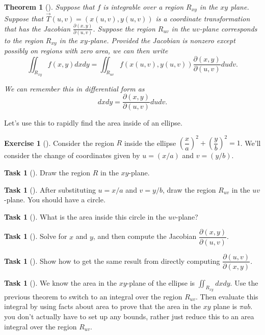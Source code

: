 \documentclass[10pt,]{book}
\theoremstyle{plain}
\newtheorem{theorem}{Theorem}[section]
\theoremstyle{definition}
\theoremstyle{definition}
\theoremstyle{definition}
\theoremstyle{definition}
\newtheorem{exploration}[project]{Exercise}
\newtheorem{task}[project]{Task}
\theoremstyle{definition}
\numberwithin{equation}{section}
\newcommand{\ds}{\displaystyle}
\begin{document}
\begin{theorem}[{}]\label{theorem-11}
Suppose that \(f\) is integrable over a region \(R_{xy}\) in the \(xy\) plane. Suppose that \(\vec T(u,v)=(x(u,v),y(u,v))\) is a coordinate transformation that has the Jacobian \(\ds \frac{\partial (x,y)}{\partial (u,v)}\). Suppose the region \(R_{uv}\) in the \(uv\)-plane corresponds to the region \(R_{xy}\) in the \(xy\)-plane. Provided the Jacobian is nonzero except possibly on regions with zero area, we can then write%
\begin{equation*}
\iint_{R_{xy}} f(x,y) dxdy = \iint_{R_{uv}} f(x(u,v),y(u,v)) \frac{\partial (x,y)}{\partial (u,v)} dudv.
\end{equation*}
%
\par
We can remember this in differential form as%
\begin{equation*}
dxdy = \frac{\partial (x,y)}{\partial (u,v)} dudv.
\end{equation*}
%
\end{theorem}
Let's use this to rapidly find the area inside of an ellipse.%
\begin{exploration}[]\label{exploration-269}
Consider the region \(R\) inside the ellipse \(\left(\dfrac{x}{a}\right)^2+\left(\dfrac{y}{b}\right)^2=1\). We'll consider the change of coordinates given by \(u=(x/a)\) and \(v=(y/b)\).%
\begin{task}[]\label{task-726}
Draw the region \(R\) in the \(xy\)-plane.%
\end{task}
\begin{task}[]\label{task-727}
After substituting \(u=x/a\) and \(v=y/b\), draw the region \(R_{uv}\) in the \(uv\)-plane.  You should have a circle.%
\end{task}
\begin{task}[]\label{task-728}
What is the area inside this circle in the \(uv\)-plane?%
\end{task}
\begin{task}[]\label{task-729}
Solve for \(x\) and \(y\), and then compute the Jacobian  \(\dfrac{\partial (x,y)}{\partial (u,v)}\).%
\end{task}
\begin{task}[]\label{task-730}
Show how to get the same result from directly computing \(\dfrac{\partial (u,v)}{\partial (x,y)}\).%
\end{task}
\begin{task}[]\label{task-731}
We know the area in the \(xy\)-plane of the ellipse is \(\iint_{R_{xy}} dxdy\). Use the previous theorem to switch to an integral over the region \(R_{uv}\).  Then evaluate this integral by using facts about area to prove that the area in the \(xy\) plane is \(\pi a b\). you don't actually have to set up any bounds, rather just reduce this to an area integral over the region \(R_{uv}\).%
%
\end{task}
\end{exploration}
\end{document}
